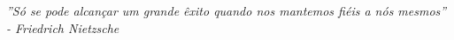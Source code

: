 \begin{epigrafe}
    \vspace*{\fill}
    \begin{flushright}
        \textit{''Só se pode alcançar um grande êxito quando nos mantemos fiéis a nós mesmos'' - Friedrich Nietzsche}
    \end{flushright}
\end{epigrafe}